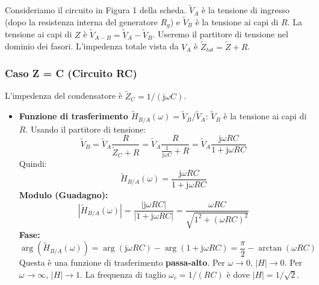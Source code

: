 \documentclass[a4paper, 11pt]{article}
\newcommand{\jj}{\mathrm{j}} %
\newcommand{\abs}[1]{\left|#1\right|}
\newcommand{\argum}[1]{\arg\left(#1\right)}
\begin{document}
Consideriamo il circuito in Figura 1 della scheda. $\tilde{V}_A$ è la tensione di ingresso (dopo la resistenza interna del generatore $R_g$) e $\tilde{V}_B$ è la tensione ai capi di $R$. La tensione ai capi di $Z$ è $\tilde{V}_{A-B} = \tilde{V}_A - \tilde{V}_B$. Useremo il partitore di tensione nel dominio dei fasori. L'impedenza totale vista da $V_A$ è $\tilde{Z}_{tot} = \tilde{Z} + R$.

\subsubsection{Caso Z = C (Circuito RC)}
L'impedenza del condensatore è $\tilde{Z}_C = 1/(\jj \omega C)$.

\begin{itemize}
    \item \textbf{Funzione di trasferimento $\tilde{H}_{B/A}(\omega) = \tilde{V}_B / \tilde{V}_A$}:
        $\tilde{V}_B$ è la tensione ai capi di $R$. Usando il partitore di tensione:
        \begin{equation}
            \tilde{V}_B = \tilde{V}_A \frac{R}{\tilde{Z}_C + R} = \tilde{V}_A \frac{R}{\frac{1}{\jj \omega C} + R} = \tilde{V}_A \frac{\jj \omega R C}{1 + \jj \omega R C}
        \end{equation}
        Quindi:
        \begin{equation} \label{eq:H_RC_VBVA}
            \tilde{H}_{B/A}(\omega) = \frac{\jj \omega R C}{1 + \jj \omega R C}
        \end{equation}
        \textbf{Modulo (Guadagno):}
        \begin{equation}
            \abs{\tilde{H}_{B/A}(\omega)} = \frac{\abs{\jj \omega R C}}{\abs{1 + \jj \omega R C}} = \frac{\omega R C}{\sqrt{1^2 + (\omega R C)^2}}
        \end{equation}
        \textbf{Fase:}
        \begin{equation}
            \argum{\tilde{H}_{B/A}(\omega)} = \argum{\jj \omega R C} - \argum{1 + \jj \omega R C} = \frac{\pi}{2} - \arctan(\omega R C)
        \end{equation}
        Questa è una funzione di trasferimento \textbf{passa-alto}. Per $\omega \to 0$, $\abs{H} \to 0$. Per $\omega \to \infty$, $\abs{H} \to 1$. La frequenza di taglio $\omega_c = 1/(RC)$ è dove $\abs{H} = 1/\sqrt{2}$.


\end{itemize}
\end{document}
